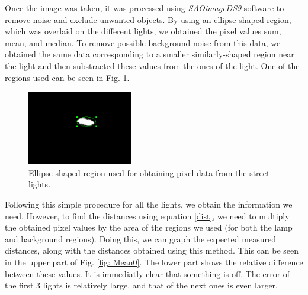 \documentclass[aps,rmp,twocolumn,nofootinbib,superscriptaddress,floatfix,longbibliography]{revtex4-2}
\begin{document}
Once the image was taken, it was processed using \textit{SAOimageDS9} software to remove noise and exclude unwanted objects. By using an ellipse-shaped region, which was overlaid on the different lights, we obtained the pixel values sum, mean, and median. To remove possible background noise from this data, we obtained the same data corresponding to a smaller similarly-shaped region near the light and then substracted these values from the ones of the light. One of the regions used can be seen in Fig. \ref{fig: ellipse}.
\begin{figure}[h]
    \centering
    \includegraphics[width=0.41\textwidth]{Images/Ellipse_region.png}
    \caption{Ellipse-shaped region used for obtaining pixel data from the street lights.}
    \label{fig: ellipse}
\end{figure}

Following this simple procedure for all the lights, we obtain the information we need. However, to find the distances using equation \eqref{dist}, we need to multiply the obtained pixel values by the area of the regions we used (for both the lamp and background regions). Doing this, we can graph the expected measured distances, along with the distances obtained using this method. This can be seen in the upper part of Fig. \ref{fig: Mean0}. The lower part shows the relative difference between these values. It is immediatly clear that something is off. The error of the first 3 lights is relatively large, and that of the next ones is even larger.
\end{document}

